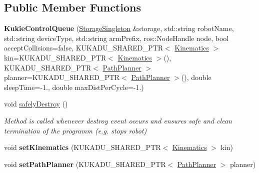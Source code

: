 \subsection*{Public Member Functions}
\begin{DoxyCompactItemize}
\item 
{\bfseries Kukie\+Control\+Queue} (\hyperlink{classkukadu_1_1StorageSingleton}{Storage\+Singleton} \&storage, std\+::string robot\+Name, std\+::string device\+Type, std\+::string arm\+Prefix, ros\+::\+Node\+Handle node, bool accept\+Collisions=false, K\+U\+K\+A\+D\+U\+\_\+\+S\+H\+A\+R\+E\+D\+\_\+\+P\+TR$<$ \hyperlink{classkukadu_1_1Kinematics}{Kinematics} $>$ kin=K\+U\+K\+A\+D\+U\+\_\+\+S\+H\+A\+R\+E\+D\+\_\+\+P\+TR$<$ \hyperlink{classkukadu_1_1Kinematics}{Kinematics} $>$(), K\+U\+K\+A\+D\+U\+\_\+\+S\+H\+A\+R\+E\+D\+\_\+\+P\+TR$<$ \hyperlink{classkukadu_1_1PathPlanner}{Path\+Planner} $>$ planner=K\+U\+K\+A\+D\+U\+\_\+\+S\+H\+A\+R\+E\+D\+\_\+\+P\+TR$<$ \hyperlink{classkukadu_1_1PathPlanner}{Path\+Planner} $>$(), double sleep\+Time=-\/1., double max\+Dist\+Per\+Cycle=-\/1.)\hypertarget{classkukadu_1_1KukieControlQueue_a73e6eef8ab4943e4c458a28e4b2fae8d}{}\label{classkukadu_1_1KukieControlQueue_a73e6eef8ab4943e4c458a28e4b2fae8d}

\item 
void \hyperlink{classkukadu_1_1KukieControlQueue_a39da1e622d39d7870c9d0e802d5afa4b}{safely\+Destroy} ()
\begin{DoxyCompactList}\small\item\em Method is called whenever destroy event occurs and ensures safe and clean termination of the programm (e.\+g. stops robot) \end{DoxyCompactList}\item 
void {\bfseries set\+Kinematics} (K\+U\+K\+A\+D\+U\+\_\+\+S\+H\+A\+R\+E\+D\+\_\+\+P\+TR$<$ \hyperlink{classkukadu_1_1Kinematics}{Kinematics} $>$ kin)\hypertarget{classkukadu_1_1KukieControlQueue_a0e8516eeb18eabfe472ef2552adb5855}{}\label{classkukadu_1_1KukieControlQueue_a0e8516eeb18eabfe472ef2552adb5855}

\item 
void {\bfseries set\+Path\+Planner} (K\+U\+K\+A\+D\+U\+\_\+\+S\+H\+A\+R\+E\+D\+\_\+\+P\+TR$<$ \hyperlink{classkukadu_1_1PathPlanner}{Path\+Planner} $>$ planner)\hypertarget{classkukadu_1_1KukieControlQueue_ae4fed3b50bbe1ea52be8ee5b0c327462}{}\label{classkukadu_1_1KukieControlQueue_ae4fed3b50bbe1ea52be8ee5b0c327462}


\end{DoxyCompactItemize}
